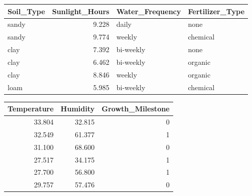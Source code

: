\documentclass[12pt,a4paper]{article}
\begin{document}
{        \begin{center}    
            \begin{tabular}{lrll}
                \toprule
                Soil\_Type & Sunlight\_Hours & Water\_Frequency & Fertilizer\_Type \\
                \midrule
                sandy & 9.228 & daily     & none     \\
                sandy & 9.774 & weekly    & chemical \\
                clay  & 7.392 & bi-weekly & none     \\
                clay  & 6.462 & bi-weekly & organic  \\
                clay  & 8.846 & weekly    & organic  \\
                loam  & 5.985 & bi-weekly & chemical \\
                \bottomrule
            \end{tabular}
            \begin{tabular}{rrr}
                \toprule
                Temperature & Humidity & Growth\_Milestone \\
                \midrule
                33.804 & 32.815 & 0 \\
                32.549 & 61.377 & 1 \\
                31.100 & 68.600 & 0 \\
                27.517 & 34.175 & 1 \\
                27.700 & 56.800 & 1 \\
                29.757 & 57.476 & 0 \\
                \bottomrule
            \end{tabular}
        \end{center}

    }
    \newpage
\end{document}
